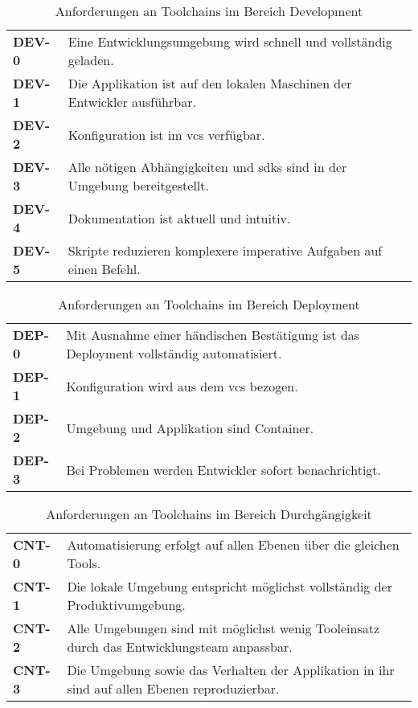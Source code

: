 \begin{table}[H]
    \begin{tabular}{ >{\bfseries\ttfamily}p{} >{}p{} }
        DEV-0   &   Eine Entwicklungsumgebung wird schnell und vollständig geladen. \\
        DEV-1   &   Die Applikation ist auf den lokalen Maschinen der Entwickler ausführbar. \\
        DEV-2   &   Konfiguration ist im \Gls{vcs} verfügbar. \\
        DEV-3   &   Alle nötigen Abhängigkeiten und \Glspl{sdk} \newline sind in der Umgebung bereitgestellt. \\
        DEV-4   &   Dokumentation ist aktuell und intuitiv. \\
        DEV-5   &   Skripte reduzieren komplexere imperative Aufgaben auf einen Befehl. \\
    \end{tabular}
    \caption{Anforderungen an Toolchains im Bereich Development}
    \label{tab:requirements-development}
\end{table}

\begin{table}[H]
    \begin{tabular}{ >{\bfseries\ttfamily}p{} >{}p{} }
        DEP-0   &   Mit Ausnahme einer händischen Bestätigung ist \newline das Deployment vollständig automatisiert. \\
        DEP-1   &   Konfiguration wird aus dem \Gls{vcs} bezogen. \\
        DEP-2   &   Umgebung und Applikation sind Container. \\
        DEP-3   &   Bei Problemen werden Entwickler sofort benachrichtigt. \\
    \end{tabular}
    \caption{Anforderungen an Toolchains im Bereich Deployment}
    \label{tab:requirements-deployment}
\end{table}

\begin{table}[H]
    \begin{tabular}{ >{\bfseries\ttfamily}p{} >{}p{} }
        CNT-0   &   Automatisierung erfolgt auf allen Ebenen über die gleichen Tools. \\
        CNT-1   &   Die lokale Umgebung entspricht möglichst vollständig der Produktivumgebung. \\
        CNT-2   &   Alle Umgebungen sind mit möglichst wenig Tooleinsatz \newline durch das Entwicklungsteam anpassbar. \\
        CNT-3   &   Die Umgebung sowie das Verhalten der Applikation in ihr \newline sind auf allen Ebenen reproduzierbar. \\
    \end{tabular}
    \caption{Anforderungen an Toolchains im Bereich Durchgängigkeit}
    \label{tab:requirements-continuity}
\end{table}

